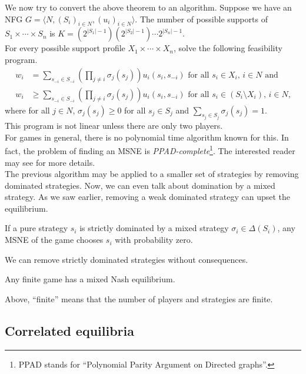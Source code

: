 	We now try to convert the above theorem to an algorithm. Suppose we have an NFG $G = \langle N , (S_i)_{i \in N} , (u_i)_{i \in N} \rangle$. The number of possible supports of $S_1 \times \cdots \times S_n$ is $K = (2^{|S_1|-1})(2^{|S_2|-1})\cdots2^{|S_n|-1}$.\\
	For every possible support profile $X_1 \times \cdots \times X_n$, solve the following feasibility program.
	\begin{align*}
		w_i &= \sum_{s_{-i} \in S_{-i}} \left( \prod_{j \ne i} \sigma_j(s_j) \right) u_i(s_i,s_{-i}) \text{ for all $s_i \in X_i$, $i \in N$ and} \\
		w_i &\ge \sum_{s_{-i} \in S_{-i}} \left( \prod_{j \ne i} \sigma_j(s_j) \right) u_i(s_i,s_{-i}) \text{ for all $s_i \in (S_i \setminus X_i)$, $i \in N$,}
	\end{align*}
	where for all $j \in N$, $\sigma_j(s_j) \ge 0$ for all $s_j \in S_j$ and $\sum_{s_j \in S_j} \sigma_j(s_j) = 1$.\\
	This program is not linear unless there are only two players.\\
	For games in general, there is no polynomial time algorithm known for this. In fact, the problem of finding an MSNE is \emph{PPAD-complete}\footnote{PPAD stands for ``Polynomial Parity Argument on Directed graphs''.}. The interested reader may see \cite{Daskalakis2009TheCO} for more details.\\

	The previous algorithm may be applied to a smaller set of strategies by removing dominated strategies. Now, we can even talk about domination by a mixed strategy. As we saw earlier, removing a weak dominated strategy can upset the equilibrium. 

	\begin{ftheo}
		If a pure strategy $s_i$ is strictly dominated by a mixed strategy $\sigma_i \in \Delta(S_i)$, any MSNE of the game chooses $s_i$ with probability zero.
	\end{ftheo}
	We can remove strictly dominated strategies without consequences.

	\begin{ftheo}
		\label{theo: msne exists}
		Any finite game has a mixed Nash equilibrium.
	\end{ftheo}
	Above, ``finite'' means that the number of players and strategies are finite.


\subsection{Correlated equilibria}

